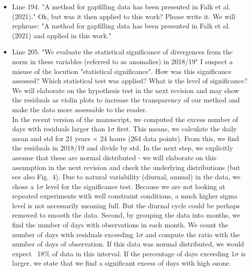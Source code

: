 \documentclass{scrartcl}
\begin{document}
\begin{itemize}
\item {\color{blue}Line 194. "A method for gapfilling data has been presented in Falk et al. (2021)."
Ok, but was it then applied to this work? Please write it.}
We will rephrase: "A method for gapfilling data has been presented in Falk et al. (2021) and applied in this work."

\item {\color{blue}Line 205. "We evaluate the statistical significance of divergences from the norm in these variables (referred to as anomalies) in 2018/19"
I suspect a misuse of the locution "statistical significance". How was this significance assessed? Which statistical test was applied? What is the level of significance?}
We will elaborate on the hypothesis test in the next revision and may show the residuals as violin plots to increase the transparency of our method and make the data more assessable to the reader.\\
In the recent version of the manuscript, we computed the excess number of days with residuals larger than $1\sigma$ first. This means, we calculate the daily mean and std for 21 years $\times$ 24 hours (264 data points).
From this, we find the residuals in 2018/19 and divide by std. In the next step, we explicitly assume that these are normal distributed - we will elaborate on this assumption in the next revision and check the underlying distributions (but see also Fig.~4). Due to natural variability (diurnal, annual) in the data, we chose a $1\sigma$ level for the significance test. Because we are not looking at repeated experiments with well constraint conditions, a much higher sigma level is not necessarily meaning full. But the diurnal cycle could be perhaps removed to smooth the data. Second, by grouping the data into months, we find the number of days with observations in each month. We count the number of days with residuals exceeding $1\sigma$ and compute the ratio with the number of days of observation. If this data was normal distributed, we would expect ~18\% of data in this interval. If the percentage of days exceeding $1\sigma$ is larger, we state that we find a significant excess of days with high ozone.


\end{itemize}
\end{document}
